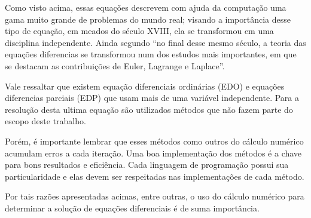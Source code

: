 Como visto acima, essas equações descrevem com ajuda da computação
uma gama muito grande de problemas do mundo real; visando a importância
desse tipo de equação, em meados do século XVIII, ela se transformou em
uma disciplina independente. Ainda segundo  ``no final desse 
mesmo século, a teoria das equações diferencias se transformou num
dos estudos mais importantes, em que se destacam as contribuições de 
Euler, Lagrange e Laplace''.

Vale ressaltar que existem equação diferenciais ordinárias (EDO) e
equações diferencias parciais (EDP) que usam mais de uma variável
independente. Para a resolução desta ultima equação são utilizados
métodos que não fazem parte do escopo deste trabalho.
 
Porém, é importante lembrar que esses métodos
como outros do cálculo numérico acumulam erros a cada iteração.
Uma boa implementação dos métodos é a chave para bons resultados
e eficiência. Cada linguagem de programação possui sua particularidade
e elas devem ser respeitadas nas implementações de cada método. 

Por tais razões apresentadas acimas, entre outras, o uso do cálculo
numérico para determinar a solução de equações diferenciais 
é de suma importância.
